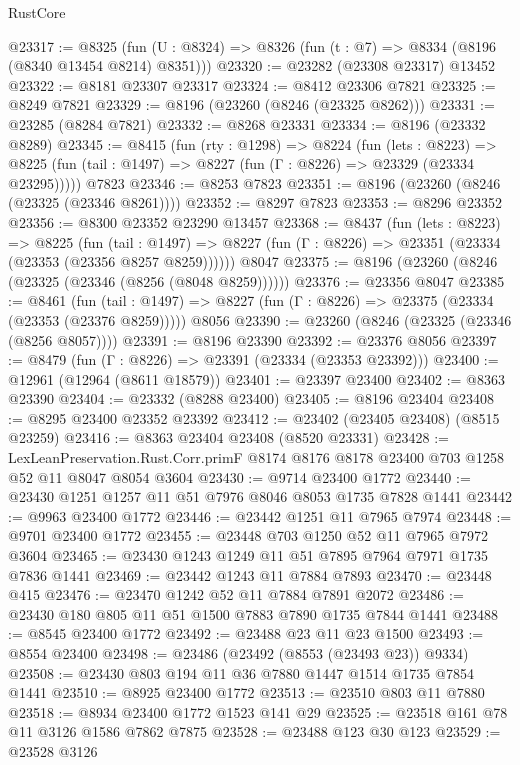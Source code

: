 \begin{lexlean}{RustCore}
\begin{coremodule}
@23317 := @8325
    (fun (U : @8324) => @8326 (fun (t : @7) => @8334 (@8196 (@8340 @13454 @8214) @8351)))
@23320 := @23282 (@23308 @23317) @13452
@23322 := @8181 @23307 @23317
@23324 := @8412 @23306 @7821
@23325 := @8249 @7821
@23329 := @8196 (@23260 (@8246 (@23325 @8262)))
@23331 := @23285 (@8284 @7821)
@23332 := @8268 @23331
@23334 := @8196 (@23332 @8289)
@23345 := @8415
    (fun (rty : @1298) =>
    @8224
      (fun (lets : @8223) =>
      @8225 (fun (tail : @1497) => @8227 (fun (Γ : @8226) => @23329 (@23334 @23295)))))
    @7823
@23346 := @8253 @7823
@23351 := @8196 (@23260 (@8246 (@23325 (@23346 @8261))))
@23352 := @8297 @7823
@23353 := @8296 @23352
@23356 := @8300 @23352 @23290 @13457
@23368 := @8437
    (fun (lets : @8223) =>
    @8225
      (fun (tail : @1497) =>
      @8227 (fun (Γ : @8226) => @23351 (@23334 (@23353 (@23356 @8257 @8259))))))
    @8047
@23375 := @8196 (@23260 (@8246 (@23325 (@23346 (@8256 (@8048 @8259))))))
@23376 := @23356 @8047
@23385 := @8461
    (fun (tail : @1497) => @8227 (fun (Γ : @8226) => @23375 (@23334 (@23353 (@23376 @8259)))))
    @8056
@23390 := @23260 (@8246 (@23325 (@23346 (@8256 @8057))))
@23391 := @8196 @23390
@23392 := @23376 @8056
@23397 := @8479 (fun (Γ : @8226) => @23391 (@23334 (@23353 @23392)))
@23400 := @12961 (@12964 (@8611 @18579))
@23401 := @23397 @23400
@23402 := @8363 @23390
@23404 := @23332 (@8288 @23400)
@23405 := @8196 @23404
@23408 := @8295 @23400 @23352 @23392
@23412 := @23402 (@23405 @23408) (@8515 @23259)
@23416 := @8363 @23404 @23408 (@8520 @23331)
@23428 := LexLeanPreservation.Rust.Corr.primF
    @8174
    @8176
    @8178
    @23400
    @703
    @1258
    @52
    @11
    @8047
    @8054
    @3604
@23430 := @9714 @23400 @1772
@23440 := @23430 @1251 @1257 @11 @51 @7976 @8046 @8053 @1735 @7828 @1441
@23442 := @9963 @23400 @1772
@23446 := @23442 @1251 @11 @7965 @7974
@23448 := @9701 @23400 @1772
@23455 := @23448 @703 @1250 @52 @11 @7965 @7972 @3604
@23465 := @23430 @1243 @1249 @11 @51 @7895 @7964 @7971 @1735 @7836 @1441
@23469 := @23442 @1243 @11 @7884 @7893
@23470 := @23448 @415
@23476 := @23470 @1242 @52 @11 @7884 @7891 @2072
@23486 := @23430 @180 @805 @11 @51 @1500 @7883 @7890 @1735 @7844 @1441
@23488 := @8545 @23400 @1772
@23492 := @23488 @23 @11 @23 @1500
@23493 := @8554 @23400
@23498 := @23486 (@23492 (@8553 (@23493 @23)) @9334)
@23508 := @23430 @803 @194 @11 @36 @7880 @1447 @1514 @1735 @7854 @1441
@23510 := @8925 @23400 @1772
@23513 := @23510 @803 @11 @7880
@23518 := @8934 @23400 @1772 @1523 @141 @29
@23525 := @23518 @161 @78 @11 @3126 @1586 @7862 @7875
@23528 := @23488 @123 @30 @123
@23529 := @23528 @3126

\end{coremodule}
\end{lexlean}
